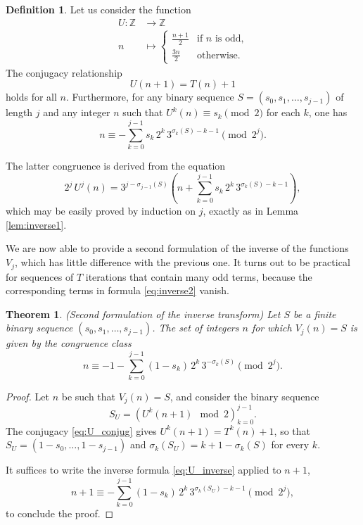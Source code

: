 \documentclass[12pt]{article}
\newtheorem{theorem}{Theorem}
\theoremstyle{definition}
\newtheorem{definition}{Definition}
\begin{document}
\begin{definition} \label{def:U}
Let us consider the function
$$ \begin{array}{rl}
 U: \mathbb Z & \longrightarrow \mathbb Z\\
 n & \longmapsto \left\{\begin{array}{ll}
  \frac{n+1}{2} & \mbox{if $n$ is odd,} \\
  \frac{3n}{2} & \mbox{otherwise.} 
\end{array}\right.
\end{array}$$
The conjugacy relationship
\begin{equation} \label{eq:U_conjug}
U(n+1) = T(n) + 1 
\end{equation}
holds for all $n$. Furthermore, for any binary sequence $S=\left( s_0, s_1, \ldots, s_{j-1} \right)$ of length $j$ and any integer $n$ such that $U^{k}(n) \equiv s_k \pmod{2}$ for each $k$, one has
\begin{equation} \label{eq:U_inverse}
n \equiv - \sum_{k=0}^{j-1} s_{k} \, 2^{k} \, 3^{\sigma_{k}(S)-k-1} \pmod{ 2^{j}}.
\end{equation}
\end{definition}
The latter congruence is derived from the equation
$$ 2^{j} \, U^{j}(n) = 3^{j-\sigma_{j-1}(S)} \left( n + \sum_{k=0}^{j-1} s_{k} \, 2^{k} \, 3^{\sigma_{k}(S)-k-1} \right),$$
which may be easily proved by induction on $j$, exactly as in Lemma \ref{lem:inverse1}.

We are now able to provide a second formulation of the inverse of the  functions $V_j$, which has little difference with the previous one. It turns out to be practical for sequences of $T$ iterations that contain many odd terms, because the corresponding terms in formula \eqref{eq:inverse2} vanish.

\begin{theorem}{\em (Second formulation of the inverse transform)} \label{th:inverse2}
Let $S$ be a finite binary sequence $\left( s_0, s_1, \ldots, s_{j-1} \right)$. The set of integers $n$ for which $V_{j}(n) = S$ is given by the congruence class
\begin{equation} \label{eq:inverse2}
n \equiv -1 - \sum_{k=0}^{j-1} (1-s_{k}) \, 2^{k} \, 3^{-\sigma_{k}(S)} \pmod{ 2^{j}}.
\end{equation}
\end{theorem}

\begin{proof}
Let $n$ be such that $V_{j}(n) = S$, and consider the binary sequence $$S_U = \left( U^{k}(n+1) \mod 2 \right)_{k=0}^{j-1}.$$ The conjugacy \eqref{eq:U_conjug} gives $U^k(n+1) = T^k(n)+1$, so that $S_U = \left( 1-s_0, \ldots, 1-s_{j-1} \right)$ and $\sigma_{k}(S_U) = k+1-\sigma_{k}(S)$ for every $k$.

It suffices to write the inverse formula \eqref{eq:U_inverse} applied to $n+1$,
$$ n + 1 \equiv - \sum_{k=0}^{j-1} (1-s_{k}) \, 2^{k} \, 3^{\sigma_{k}(S_U)-k-1} \pmod{ 2^{j}},$$
to conclude the proof.
\end{proof}
\end{document}
